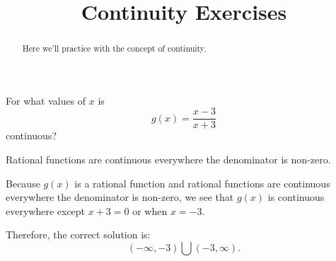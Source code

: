 \documentclass[handout]{ximera}
\title[Exercises:]{Continuity Exercises}
\begin{document}
\begin{abstract}
  Here we'll practice with the concept of continuity.
\end{abstract}
\maketitle

\begin{exercise}
For what values of $x$ is \[g(x) = \frac{x-3}{x+3}\] continuous?


\begin{hint}
Rational functions are continuous everywhere the denominator is
non-zero.
\end{hint}


\begin{hint}
Because $g(x)$ is a rational function and rational functions are
continuous everywhere the denominator is non-zero, we see that $g(x)$ is
continuous everywhere except $x+3 = 0$ or when $x=-3$.

Therefore, the correct solution is:
\[(-\infty, -3) \bigcup (-3, \infty).\]
\end{hint}


\begin{multipleChoice}
\choice{$(-\infty, \infty)$}
\end{multipleChoice}

\end{exercise}
\end{document}
